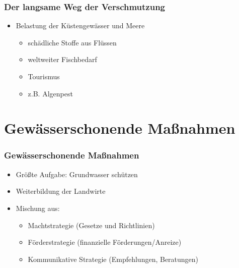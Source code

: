 \documentclass{beamer}
\begin{document}
	\begin{frame}
		\frametitle{Der langsame Weg der Verschmutzung}
		\LARGE
		
		\begin{itemize}
			\item Belastung der Küstengewässer und Meere
			\begin{itemize}
				\LARGE
				\item schädliche Stoffe aus Flüssen
				
				\item weltweiter Fischbedarf
				
				\item Tourismus
				
				\item z.B. Algenpest
				
			\end{itemize}
			
		\end{itemize}
		
	\end{frame}
	
	\section{Gewässerschonende Maßnahmen}
	\begin{frame}
		\frametitle{Gewässerschonende Maßnahmen}
		\LARGE
		
		\begin{itemize}
			\item Größte Aufgabe: Grundwasser schützen
			
			\item Weiterbildung der Landwirte
			
			\item Mischung aus:
			
			\begin{itemize}
				\LARGE
				\item Machtstrategie \normalsize (Gesetze und Richtlinien)
				
				\LARGE
				\item Förderstrategie \normalsize (finanzielle Förderungen/Anreize)
				
				\LARGE
				\item Kommunikative Strategie \normalsize(Empfehlungen, Beratungen)
			\end{itemize}
				
		\end{itemize}
		
	\end{frame}
	
\end{document}
